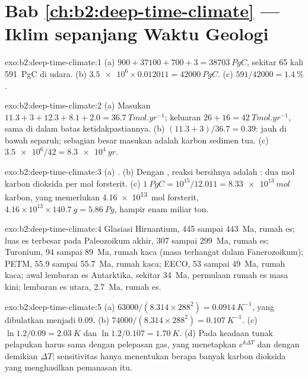 \section*{Bab \ref{ch:b2:deep-time-climate} --- Iklim sepanjang Waktu Geologi}

\begin{solution}{exo:b2:deep-time-climate:1}
(a) $900 + 37100 + 700 + 3 = \qty{38703}{PgC}$, sekitar 65 kali \qty{591}{PgC} di udara.
(b) $\num{3.5e6}\times0.012011 = \qty{42000}{PgC}$. (c) $591/42000 = \qty{1.4}{\percent}$.
\end{solution}

\begin{solution}{exo:b2:deep-time-climate:2}
(a) Masukan $11.3 + 3 + 12.3 + 8.1 + 2.0 = \qty{36.7}{Tmol.yr^{-1}}$; keluaran $26 + 16 =
\qty{42}{Tmol.yr^{-1}}$, sama di dalam batas ketidakpastiannya. (b) $(11.3 + 3)/36.7 = 0.39$: jauh
di bawah separuh; sebagian besar masukan adalah karbon sedimen tua. (c) $\num{3.5e6}/42 = \qty{8.3e4}{yr}$.
\end{solution}

\begin{solution}{exo:b2:deep-time-climate:3}
(a) . (b) Dengan , reaksi bersihnya adalah : dua mol
karbon dioksida per mol forsterit. (c) $\qty{1}{PgC} = 10^{15}/12.011 =
\qty{8.33e13}{mol}$ karbon, yang memerlukan \qty{4.16e13}{mol} forsterit, $4.16\times10^{13}
\times\qty{140.7}{g} = \qty{5.86}{Pg}$, hampir enam miliar ton.
\end{solution}

\begin{solution}{exo:b2:deep-time-climate:4}
Glasiasi Hirnantium, 445 sampai \qty{443}{Ma}, rumah es; luas es terbesar pada Paleozoikum akhir, 307 sampai
\qty{299}{Ma}, rumah es; Turonium, 94 sampai \qty{89}{Ma}, rumah kaca (masa terhangat dalam Fanerozoikum);
PETM, 55.9 sampai \qty{55.7}{Ma}, rumah kaca; EECO, 53 sampai \qty{49}{Ma}, rumah kaca; awal lembaran
es Antarktika, sekitar \qty{34}{Ma}, permulaan rumah es masa kini; lembaran es utara,
\qty{2.7}{Ma}, rumah es.
\end{solution}

\begin{solution}{exo:b2:deep-time-climate:5}
(a) $63000/(8.314\times288^2) = \qty{0.0914}{K^{-1}}$, yang dibulatkan menjadi 0.09. (b) $74000/(8.314
\times288^2) = \qty{0.107}{K^{-1}}$. (c) $\ln1.2/0.09 = \qty{2.03}{K}$ dan $\ln 1.2/0.107 =
\qty{1.70}{K}$. (d) Pada keadaan tunak pelapukan harus sama dengan pelepasan gas, yang menetapkan $e^{k
\Delta T}$ dan dengan demikian $\Delta T$; sensitivitas hanya menentukan berapa banyak karbon dioksida yang menghasilkan
pemanasan itu.
\end{solution}

